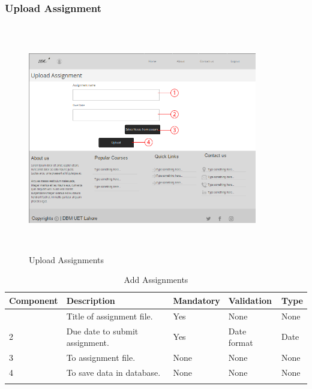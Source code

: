 \documentclass[12pt]{article}
\begin{document}
\subsubsection{Upload Assignment}
\begin{figure}[H]
  \centering
  \includegraphics[width=10cm, height=10cm]{UploadAssignmentsPage}
  \caption{Upload Assignments}
\end{figure}

\newpage
\begin{longtable}{|>{\raggedright\arraybackslash}p{2.5cm}|>{\raggedright\arraybackslash}p{4cm}|>{\raggedright\arraybackslash}p{2.2cm}|>{\raggedright\arraybackslash}p{2cm}|>{\raggedright\arraybackslash}p{2cm}|}
\hline
\textbf{Component} & \textbf{Description} & \textbf{Mandatory} & \textbf{Validation} & \textbf{Type}\\
\hline
1 &
Title of assignment file. &
Yes &
None &
None \\
\hline

2 &
Due date to submit assignment. &
Yes &
Date format &
Date \\
\hline

3 &
To assignment file. &
None &
None &
None \\
\hline

4 &
To save data in database. &
None &
None &
None \\
\hline

\caption{Add Assignments}
\end{longtable}
\end{document}
